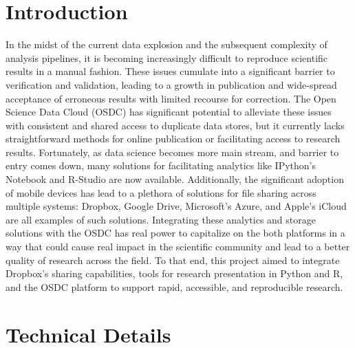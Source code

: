\documentclass[10pt,a4]{article}
\begin{document}
\maketitle

\section{Introduction}
In the midst of the current data explosion and the subsequent complexity of analysis pipelines, it is becoming increasingly difficult to reproduce scientific results in a manual fashion.
These issues cumulate into a significant barrier to verification and validation, leading to a growth in publication and wide-spread acceptance of erroneous results with limited recourse for correction. 
The Open Science Data Cloud (OSDC) has significant potential to alleviate these issues with consistent and shared access to duplicate data stores, but it currently lacks straightforward methods for online publication or facilitating access to research results.
Fortunately, as data science becomes more main stream, and barrier to entry comes down, many solutions for facilitating analytics like IPython's Notebook and R-Studio are now available. 
Additionally, the significant adoption of mobile devices has lead to a plethora of solutions for file sharing across multiple systems: Dropbox, Google Drive, Microsoft's Azure, and Apple's iCloud are all examples of such solutions.
Integrating these analytics and storage solutions with the OSDC has real power to capitalize on the  both platforms in a way that could cause real impact in the scientific community and lead to a better quality of research across the field.
To that end, this project aimed to integrate Dropbox's sharing capabilities, tools for research presentation in Python and R, and the OSDC platform to support rapid, accessible, and reproducible research.

\section{Technical Details}
\end{document}
